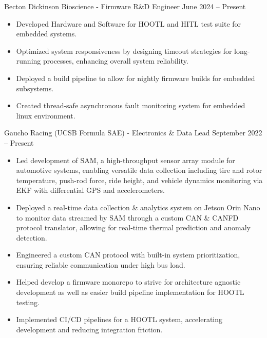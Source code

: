 \documentclass[9pt]{developercv} %
\begin{document}
\vspace{-14 pt}
\begin{entrylist}
    \entry
        {}
        {Becton Dickinson Bioscience - Firmware R\&D Engineer}
        {June 2024 – Present}
        {\vspace{-8pt}
        \begin{itemize}[noitemsep,topsep=0pt,parsep=0pt,partopsep=0pt, leftmargin=10pt]
            \item Developed Hardware and Software for HOOTL and HITL test suite for embedded systems. 
            \item Optimized system responsiveness by designing timeout strategies for long-running processes, enhancing overall system reliability. 
            \item Deployed a build pipeline to allow for nightly firmware builds for embedded subsystems.  
            \item Created thread-safe asynchronous fault monitoring system for embedded linux environment. 
        \end{itemize}}
    \entry
        {}
        {Gaucho Racing (UCSB Formula SAE) - Electronics \& Data Lead}
        {September 2022 – Present}
        {\vspace{-8pt}
        \begin{itemize}[noitemsep,topsep=0pt,parsep=0pt,partopsep=0pt, leftmargin=10pt]
            \item Led development of SAM, a high-throughput sensor array module for automotive systems, enabling versatile data collection including tire and rotor temperature, push-rod force, ride height, and vehicle dynamics monitoring via EKF with differential GPS and accelerometers.
            \item Deployed a real-time data collection \& analytics system on Jetson Orin Nano to monitor data streamed by SAM through a custom CAN \& CANFD protocol translator, allowing for real-time thermal prediction and anomaly detection. 
            \item Engineered a custom CAN protocol with built-in system prioritization, ensuring reliable communication under high bus load. 
            \item Helped develop a firmware monorepo to strive for architecture agnostic development as well as easier build pipeline implementation for HOOTL testing. 
            \item Implemented CI/CD pipelines for a HOOTL system, accelerating development and reducing integration friction.
        \end{itemize}}
\end{entrylist}
\end{document}
